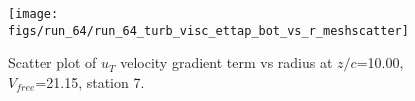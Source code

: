 \begin{figure}[H]
\centering
\texttt{[image: figs/run\_64/run\_64\_turb\_visc\_ettap\_bot\_vs\_r\_meshscatter]}
\caption{Scatter plot of $
u_T$ velocity gradient term vs radius at $z/c$=10.00, $V_{free}$=21.15, station 7.}
\end{figure}


